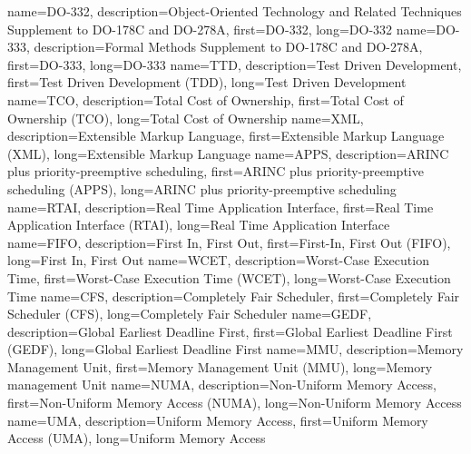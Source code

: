 {%
    name={DO-332},
    description={Object-Oriented Technology and Related Techniques Supplement to DO-178C and DO-278A},
    first={DO-332},
    long={DO-332}
}
{%
    name={DO-333},
    description={Formal Methods Supplement to DO-178C and DO-278A},
    first={DO-333},
    long={DO-333}
}
{%
    name={TTD},
    description={Test Driven Development},
    first={Test Driven Development (TDD)},
    long={Test Driven Development}
}
{%
    name={TCO},
    description={Total Cost of Ownership},
    first={Total Cost of Ownership (TCO)},
    long={Total Cost of Ownership}
}
{%
    name={XML},
    description={Extensible Markup Language},
    first={Extensible Markup Language (XML)},
    long={Extensible Markup Language}
}
{%
    name={APPS},
    description={ARINC plus priority-preemptive scheduling},
    first={ARINC plus priority-preemptive scheduling (APPS)},
    long={ARINC plus priority-preemptive scheduling}
}
{%
    name={RTAI},
    description={Real Time Application Interface},
    first={Real Time Application Interface (RTAI)},
    long={Real Time Application Interface}
}
{%
    name={FIFO},
    description={First In, First Out},
    first={First-In, First Out (FIFO)},
    long={First In, First Out}
}
{%
    name={WCET},
    description={Worst-Case Execution Time},
    first={Worst-Case Execution Time (WCET)},
    long={Worst-Case Execution Time}
}
{%
    name={CFS},
    description={Completely Fair Scheduler},
    first={Completely Fair Scheduler (CFS)},
    long={Completely Fair Scheduler}
}
{%
    name={GEDF},
    description={Global Earliest Deadline First},
    first={Global Earliest Deadline First (GEDF)},
    long={Global Earliest Deadline First}
}
{%
    name={MMU},
    description={Memory Management Unit},
    first={Memory Management Unit (MMU)},
    long={Memory management Unit}
}
{%
    name={NUMA},
    description={Non-Uniform Memory Access},
    first={Non-Uniform Memory Access (NUMA)},
    long={Non-Uniform Memory Access}
}
{%
    name={UMA},
    description={Uniform Memory Access},
    first={Uniform Memory Access (UMA)},
    long={Uniform Memory Access}
}